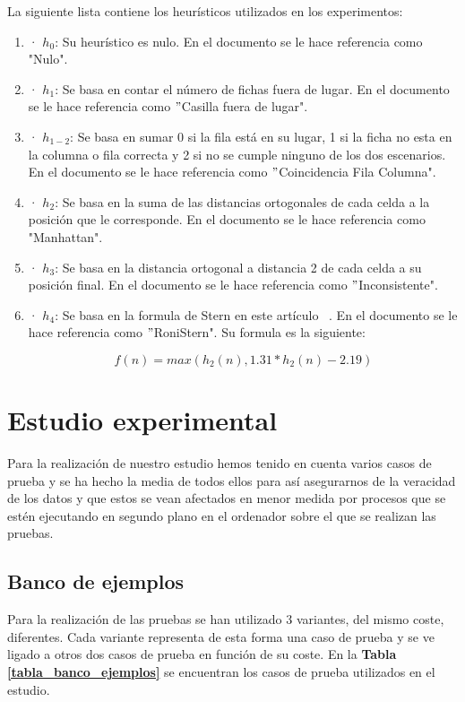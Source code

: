 \documentclass[runningheads]{llncs}
\begin{document}
La siguiente lista contiene los heurísticos utilizados en los experimentos:
\begin{enumerate}[\hspace{1cm}]
\item · $h_0$: Su heurístico es nulo. En el documento se le hace referencia como "Nulo".
\item · $h_1$: Se basa en contar el número de fichas fuera de lugar. En el documento se le hace referencia como $"$Casilla fuera de lugar".
\item · $h_{1-2}$: Se basa en sumar 0 si la fila está en su lugar, 1 si la ficha no esta en la columna o fila correcta y 2 si no se cumple ninguno de los dos escenarios. En el documento se le hace referencia como $"$Coincidencia Fila Columna".
\item · $h_2$: Se basa en la suma de las distancias ortogonales de cada celda a la posición que le corresponde. En el documento se le hace referencia como "Manhattan".
\item · $h_3$: Se basa en la distancia ortogonal a distancia 2 de cada celda a su posición final. En el documento se le hace referencia como $"$Inconsistente".
\item · $h_4$: Se basa en la formula de Stern en este artículo ~\cite{referencia_Stern}.  En el documento se le hace referencia como $"$RoniStern". Su formula es la siguiente:

\begin{equation}
f(n) = max ( h_2(n) , 1.31 * h_2(n) - 2.19)
\end{equation}

\end{enumerate}

\section{Estudio experimental}\label{seccion_estudio}

Para la realización de nuestro estudio hemos tenido en cuenta varios casos de prueba y se ha hecho la media de todos ellos para así asegurarnos de la veracidad de los datos y que estos se vean afectados en menor medida por procesos que se estén ejecutando en segundo plano en el ordenador sobre el que se realizan las pruebas.

\subsection{Banco de ejemplos}

Para la realización de las pruebas se han utilizado 3 variantes, del mismo coste, diferentes. Cada variante representa de esta forma una caso de prueba y se ve ligado a otros dos casos de prueba en función de su coste. En la \textbf{Tabla \ref{tabla_banco_ejemplos}} se encuentran los casos de prueba utilizados en el estudio.
\end{document}
